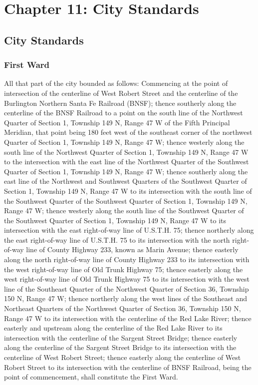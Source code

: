 \documentclass[code.tex]{subfiles}
\begin{document}
\chapter*{Chapter 11: \newline
	City Standards}


\section{City Standards}
\subsection{First Ward}
All that part of the city bounded as follows:  Commencing at the point of intersection of the centerline of West Robert Street and the centerline of the Burlington Northern Santa Fe Railroad (BNSF); thence southerly along the centerline of the BNSF Railroad to a point on the south line of the Northwest Quarter of Section 1, Township 149 N, Range 47 W of the Fifth Principal Meridian, that point being 180 feet west of the southeast corner of the northwest Quarter of Section 1, Township 149 N, Range 47 W; thence westerly along the south line of the Northwest Quarter of Section 1, Township 149 N, Range 47 W to the intersection with the east line of the Northwest Quarter of the Southwest Quarter of Section 1, Township 149 N, Range 47 W; thence southerly along the east line of the Northwest and Southwest Quarters of the Southwest Quarter of Section 1, Township 149 N, Range 47 W to its intersection with the south line of the Southwest Quarter of the Southwest Quarter of Section 1, Township 149 N, Range 47 W; thence westerly along the south line of the Southwest Quarter of the Southwest Quarter of Section 1, Township 149 N, Range 47 W to its intersection with the east right-of-way line of U.S.T.H. 75; thence northerly along the east right-of-way line of U.S.T.H. 75 to its intersection with the north right-of-way line of County Highway 233, known as Marin Avenue; thence easterly along the north right-of-way line of County Highway 233 to its intersection with the west right-of-way line of Old Trunk Highway 75; thence easterly along the west right-of-way line of Old Trunk Highway 75 to its intersection with the west line of the Southeast Quarter of the Northwest Quarter of Section 36, Township 150 N, Range 47 W; thence northerly along the west lines of the Southeast and Northeast Quarters of the Northwest Quarter of Section 36, Township 150 N, Range 47 W to its intersection with the centerline of the Red Lake River; thence easterly and upstream along the centerline of the Red Lake River to its intersection with the centerline of the Sargent Street Bridge; thence easterly along the centerline of the Sargent Street Bridge to its intersection with the centerline of West Robert Street; thence easterly along the centerline of West Robert Street to its intersection with the centerline of BNSF Railroad, being the point of commencement, shall constitute the First Ward.
\end{document}
